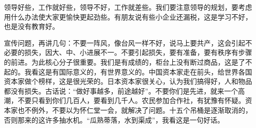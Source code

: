 领导好些，工作就好些，领导不好，工作就差些。我们要注意领导的规划，要考虑用什么办法使大家更愉快更起劲些。有朋友说有些小企业还漏税，这是学习不好，也是没有教育好。

宣传问题，再讲几句：不要一阵风，像台风一样不好，说马上要共产，这会引起不必要的损失，因大、中、小进展不一。不要引起损失，要有准备，要有秩序有步骤的前进。为此核心分子很重要。我们是有成绩的，柜台上没有断过商品，这是了不起的。我看这是有国际意义的，有世界意义的。中国资本家走在前头，给世界各国资本家做个榜样，这是很光荣的。日本资本家很关心，认为我们搞得好，人和物品都没有损失。古话说：“做好事越多，前途越好”。不要你们是先进，就来一个高潮，不要只看到你们几百人，要看到几千人。农民参加合作社，有犹豫有怀疑。资本家也不例外，不要以为怀仁堂一会，就解决了问题。十五个吊桶是逐渐取消的，否则那来的这许多抽水机。“瓜熟蒂落，水到渠成”，我看这是一句好话。


